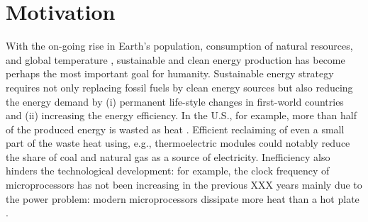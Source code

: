 
\section{Motivation}



With the on-going rise in Earth's population, consumption of natural resources, and global temperature \cite{}, sustainable and clean energy production has become perhaps the most important goal for humanity. Sustainable energy strategy requires not only replacing fossil fuels by clean energy sources but also reducing the energy demand by  (i) permanent life-style changes in first-world countries and (ii) increasing the energy efficiency. In the U.S., for example, more than half of the produced energy is wasted as heat \cite{llnl13}. Efficient reclaiming of even a small part of the waste heat using, e.g., thermoelectric modules could notably reduce the share of coal and natural gas as a source of electricity. Inefficiency also hinders the technological development: for example, the clock frequency of microprocessors has not been increasing in the previous XXX years mainly due to the power problem: modern microprocessors dissipate more heat than a hot plate \cite{pop06_ieee}. %




